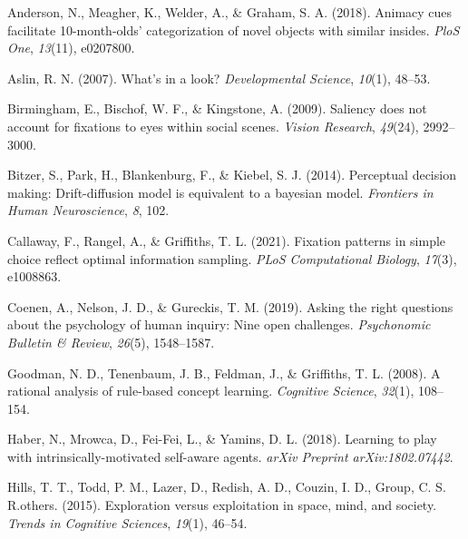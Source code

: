 \documentclass[10pt, letterpaper]{article}
\newenvironment{CSLReferences}%
  {}%
  {\par}
\begin{document}
\hypertarget{refs}{}
\begin{CSLReferences}{1}{0}
\leavevmode{}%
Anderson, N., Meagher, K., Welder, A., \& Graham, S. A. (2018). Animacy
cues facilitate 10-month-olds' categorization of novel objects with
similar insides. \emph{PloS One}, \emph{13}(11), e0207800.

\leavevmode{}%
Aslin, R. N. (2007). What's in a look? \emph{Developmental Science},
\emph{10}(1), 48--53.

\leavevmode{}%
Birmingham, E., Bischof, W. F., \& Kingstone, A. (2009). Saliency does
not account for fixations to eyes within social scenes. \emph{Vision
Research}, \emph{49}(24), 2992--3000.

\leavevmode{}%
Bitzer, S., Park, H., Blankenburg, F., \& Kiebel, S. J. (2014).
Perceptual decision making: Drift-diffusion model is equivalent to a
bayesian model. \emph{Frontiers in Human Neuroscience}, \emph{8}, 102.

\leavevmode{}%
Callaway, F., Rangel, A., \& Griffiths, T. L. (2021). Fixation patterns
in simple choice reflect optimal information sampling. \emph{PLoS
Computational Biology}, \emph{17}(3), e1008863.

\leavevmode{}%
Coenen, A., Nelson, J. D., \& Gureckis, T. M. (2019). Asking the right
questions about the psychology of human inquiry: Nine open challenges.
\emph{Psychonomic Bulletin \& Review}, \emph{26}(5), 1548--1587.

\leavevmode{}%
Goodman, N. D., Tenenbaum, J. B., Feldman, J., \& Griffiths, T. L.
(2008). A rational analysis of rule-based concept learning.
\emph{Cognitive Science}, \emph{32}(1), 108--154.

\leavevmode{}%
Haber, N., Mrowca, D., Fei-Fei, L., \& Yamins, D. L. (2018). Learning to
play with intrinsically-motivated self-aware agents. \emph{arXiv
Preprint arXiv:1802.07442}.

\leavevmode{}%
Hills, T. T., Todd, P. M., Lazer, D., Redish, A. D., Couzin, I. D.,
Group, C. S. R.others. (2015). Exploration versus exploitation in space,
mind, and society. \emph{Trends in Cognitive Sciences}, \emph{19}(1),
46--54.


\end{CSLReferences}
\end{document}
